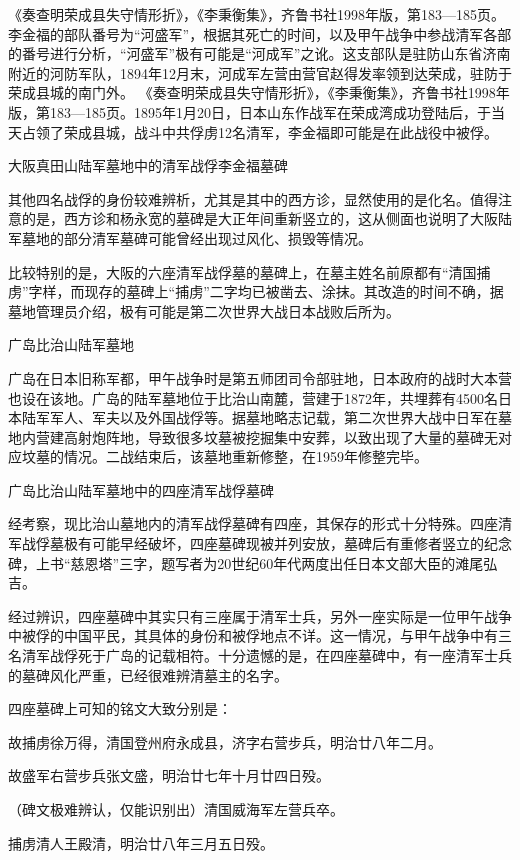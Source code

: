 \documentclass[12pt,UTF8]{ctexbook}
\begin{document}
《奏查明荣成县失守情形折》，《李秉衡集》，齐鲁书社1998年版，第183—185页。
李金福的部队番号为“河盛军”，根据其死亡的时间，以及甲午战争中参战清军各部的番号进行分析，“河盛军”极有可能是“河成军”之讹。这支部队是驻防山东省济南附近的河防军队，1894年12月末，河成军左营由营官赵得发率领到达荣成，驻防于荣成县城的南门外。 《奏查明荣成县失守情形折》，《李秉衡集》，齐鲁书社1998年版，第183—185页。1895年1月20日，日本山东作战军在荣成湾成功登陆后，于当天占领了荣成县城，战斗中共俘虏12名清军，李金福即可能是在此战役中被俘。


大阪真田山陆军墓地中的清军战俘李金福墓碑

其他四名战俘的身份较难辨析，尤其是其中的西方诊，显然使用的是化名。值得注意的是，西方诊和杨永宽的墓碑是大正年间重新竖立的，这从侧面也说明了大阪陆军墓地的部分清军墓碑可能曾经出现过风化、损毁等情况。

比较特别的是，大阪的六座清军战俘墓的墓碑上，在墓主姓名前原都有“清国捕虏”字样，而现存的墓碑上“捕虏”二字均已被凿去、涂抹。其改造的时间不确，据墓地管理员介绍，极有可能是第二次世界大战日本战败后所为。

广岛比治山陆军墓地

广岛在日本旧称军都，甲午战争时是第五师团司令部驻地，日本政府的战时大本营也设在该地。广岛的陆军墓地位于比治山南麓，营建于1872年，共埋葬有4500名日本陆军军人、军夫以及外国战俘等。据墓地略志记载，第二次世界大战中日军在墓地内营建高射炮阵地，导致很多坟墓被挖掘集中安葬，以致出现了大量的墓碑无对应坟墓的情况。二战结束后，该墓地重新修整，在1959年修整完毕。


广岛比治山陆军墓地中的四座清军战俘墓碑

经考察，现比治山墓地内的清军战俘墓碑有四座，其保存的形式十分特殊。四座清军战俘墓极有可能早经破坏，四座墓碑现被并列安放，墓碑后有重修者竖立的纪念碑，上书“慈恩塔”三字，题写者为20世纪60年代两度出任日本文部大臣的滩尾弘吉。

经过辨识，四座墓碑中其实只有三座属于清军士兵，另外一座实际是一位甲午战争中被俘的中国平民，其具体的身份和被俘地点不详。这一情况，与甲午战争中有三名清军战俘死于广岛的记载相符。十分遗憾的是，在四座墓碑中，有一座清军士兵的墓碑风化严重，已经很难辨清墓主的名字。

四座墓碑上可知的铭文大致分别是：

故捕虏徐万得，清国登州府永成县，济字右营步兵，明治廿八年二月。

故盛军右营步兵张文盛，明治廿七年十月廿四日殁。

（碑文极难辨认，仅能识别出）清国威海军左营兵卒。

捕虏清人王殿清，明治廿八年三月五日殁。
\end{document}
